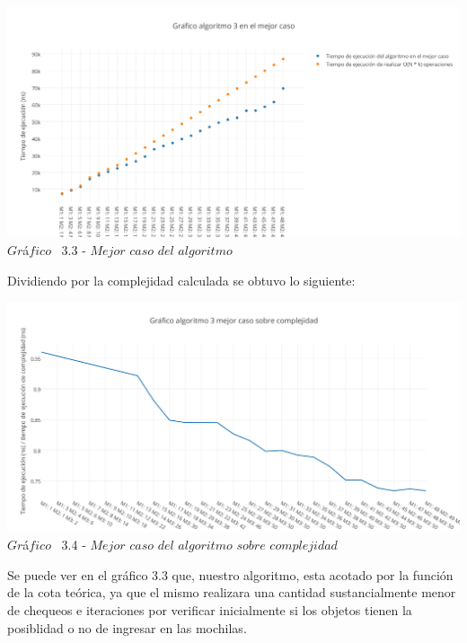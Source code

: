 \vspace*{0.3cm} \vspace*{0.3cm}
  \begin{center}
 \includegraphics[scale=0.65]{./EJ3/mejorcaso.png}
 {$Gr$\'a$fico$ \ 3.3 - $Mejor$ $caso$ $del$ $algoritmo$}
  \end{center}
  \vspace*{0.3cm}

Dividiendo por la complejidad calculada se obtuvo lo siguiente:\\

\vspace*{0.3cm} \vspace*{0.3cm}
  \begin{center}
 \includegraphics[scale=0.65]{./EJ3/mejorcaso1.png}
 {$Gr$\'a$fico$ \ 3.4 - $Mejor$ $caso$ $del$ $algoritmo$ $sobre$ $complejidad$}
  \end{center}
  \vspace*{0.3cm}
  
Se puede ver en el gr\'afico 3.3 que, nuestro algoritmo, esta acotado por la funci\'on de la cota te\'orica, ya que el mismo realizara una cantidad sustancialmente menor de chequeos e iteraciones por verificar inicialmente si los objetos tienen la posiblidad o no de ingresar en las mochilas.\\

